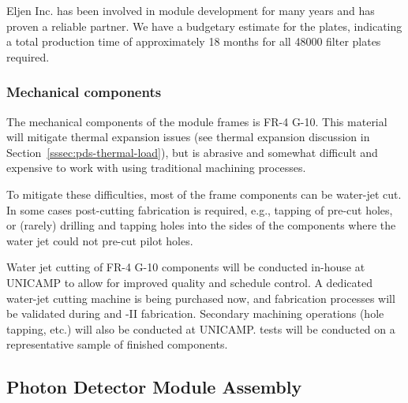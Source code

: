 
Eljen Inc. has been involved in  module development for many years and has proven a reliable partner.  We have a budgetary estimate for the plates, indicating a total production time of approximately \num{18} months for all \num{48000} filter plates required.

\subsubsection{Mechanical components}

The mechanical components of the  module frames is
FR-4 G-10. This material will mitigate thermal expansion issues (see thermal expansion discussion in Section~\ref{sssec:pds-thermal-load}),
but is abrasive and somewhat difficult and expensive to work with using traditional machining processes.

To mitigate these difficulties, most of the  frame components can be water-jet cut.
In some cases post-cutting fabrication is required, e.g., tapping of pre-cut holes, or (rarely) drilling and tapping holes into the sides of the components where the water jet could not pre-cut pilot holes.

Water jet cutting of FR-4 G-10 components will be conducted in-house at UNICAMP to allow for improved quality and schedule control.  A dedicated water-jet cutting machine is being purchased now, and fabrication processes will be validated during  and -II fabrication.  Secondary machining operations (hole tapping, etc.) will also be conducted at UNICAMP.   tests will be conducted on a representative sample of finished components.

\label{sec:fdsp-pd-prod-pc}



\subsection{Photon Detector Module Assembly}

